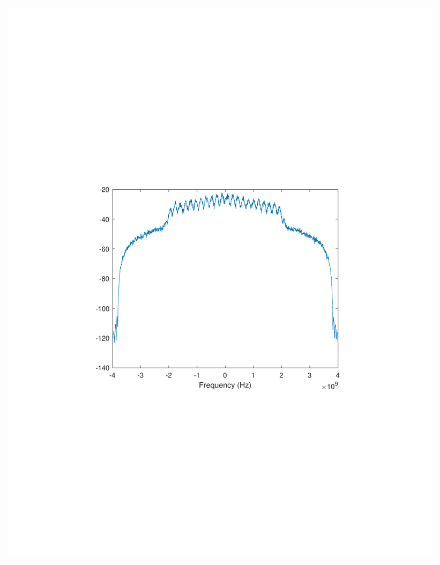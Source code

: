\begin{refsection}
\begin{figure}[H]
	\centering
	\begin{minipage}{0.30\textwidth}
		\centering
		\includegraphics[clip, trim=4cm 8cm 4cm 8cm, width=1\textwidth]{./sdf/m_qam_system/figures/expResults/homodyne/2_4GBdInSig13dB_AfMF.pdf}
		\label{fig:4GBdEyeMf}
	\end{minipage}
	\begin{minipage}{0.30\textwidth}
		\centering

\end{minipage}
\end{figure}
\end{refsection}
